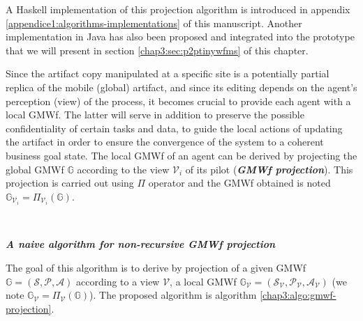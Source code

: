 A Haskell implementation of this projection algorithm is introduced in appendix \ref{appendice1:algorithms-implementations} of this manuscript. Another implementation in Java has also been proposed and integrated into the prototype that we will present in section \ref{chap3:sec:p2ptinywfms} of this chapter.


\label{chap3:sec:local-gmwf}
Since the artifact copy manipulated at a specific site is a potentially partial replica of the mobile (global) artifact, and since its editing depends on the agent's perception (view) of the process, it becomes crucial to provide each agent with a local GMWf. The latter will serve in addition to preserve the possible confidentiality of certain tasks and data, to guide the local actions of updating the artifact in order to ensure the convergence of the system to a coherent business goal state.
The local GMWf of an agent can be derived by projecting the global GMWf $\mathbb{G}$ according to the view $\mathcal{V}_i$ of its pilot (\textbf{\textit{GMWf projection}}). This projection is carried out using $\Pi$ operator and the GMWf obtained is noted $\mathbb{G}_{\mathcal{V}_i}=\Pi_{\mathcal{V}_i}\left(\mathbb{G}\right)$.

~

\noindent\textbf{\textit{A naive algorithm for non-recursive GMWf projection}}

The goal of this algorithm is to derive by projection of a given GMWf $\mathbb{G}=\left(\mathcal{S},\mathcal{P},\mathcal{A}\right)$ according to a view $\mathcal{V}$, a local GMWf $\mathbb{G}_{\mathcal{V}} = \left(\mathcal{S}_{\mathcal{V}},\mathcal{P}_{\mathcal{V}}, \mathcal{A}_{\mathcal{V}}\right)$ (we note $\mathbb{G}_{\mathcal{V}} = \Pi_{\mathcal{V}}\left(\mathbb{G} \right)$). The proposed algorithm is algorithm \ref{chap3:algo:gmwf-projection}.

